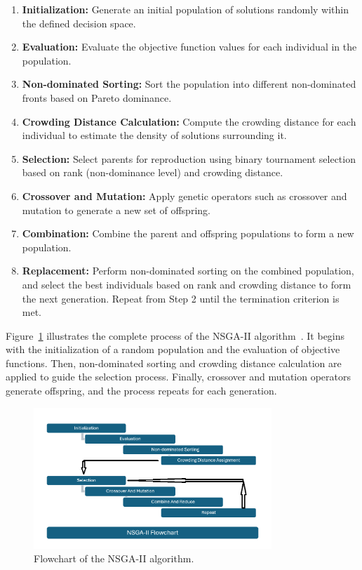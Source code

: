 \begin{enumerate}
    \item \textbf{Initialization:} Generate an initial population of solutions randomly within the defined decision space.
    
    \item \textbf{Evaluation:} Evaluate the objective function values for each individual in the population.
    
    \item \textbf{Non-dominated Sorting:} Sort the population into different non-dominated fronts based on Pareto dominance.
    
    \item \textbf{Crowding Distance Calculation:} Compute the crowding distance for each individual to estimate the density of solutions surrounding it.
    
    \item \textbf{Selection:} Select parents for reproduction using binary tournament selection based on rank (non-dominance level) and crowding distance.
    
    \item \textbf{Crossover and Mutation:} Apply genetic operators such as crossover and mutation to generate a new set of offspring.
    
    \item \textbf{Combination:} Combine the parent and offspring populations to form a new population.
    
    \item \textbf{Replacement:} Perform non-dominated sorting on the combined population, and select the best individuals based on rank and crowding distance to form the next generation. Repeat from Step 2 until the termination criterion is met.
\end{enumerate}
\newpage
Figure~\ref{fig:nsga_flowchart} illustrates the complete process of the NSGA-II algorithm~\cite{deb2002nsga2}. It begins with the initialization of a random population and the evaluation of objective functions. Then, non-dominated sorting and crowding distance calculation are applied to guide the selection process. Finally, crossover and mutation operators generate offspring, and the process repeats for each generation.
\begin{figure}[h]
    \centering    \includegraphics[width=0.8\textwidth]{../Figures/nsga-flowchart.PNG}
    \caption{Flowchart of the NSGA-II algorithm.}
    \label{fig:nsga_flowchart}
\end{figure}
